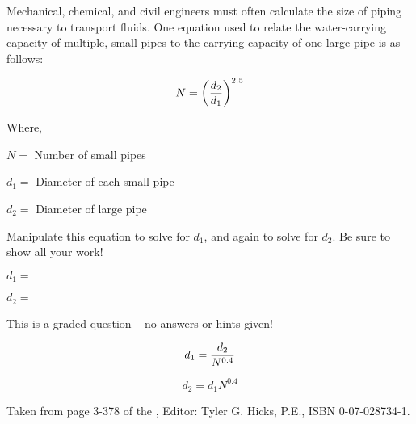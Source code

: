 

Mechanical, chemical, and civil engineers must often calculate the size of piping necessary to transport fluids.  One equation used to relate the water-carrying capacity of multiple, small pipes to the carrying capacity of one large pipe is as follows:

$$N = \biggl({d_2 \over d_1}\biggr)^{2.5}$$

\noindent
Where,

$N =$ Number of small pipes

$d_1 =$ Diameter of each small pipe

$d_2 =$ Diameter of large pipe

\vskip 30pt

Manipulate this equation to solve for $d_1$, and again to solve for $d_2$.  Be sure to show all your work!

\vskip 50pt

$d_1 = $

\vskip 100pt

$d_2 = $


\vfil 

\eject






This is a graded question -- no answers or hints given!







$$d_1 = {d_2 \over N^{0.4}}$$

$$d_2 = d_1 N^{0.4}$$

\vskip 10pt

Taken from page 3-378 of the , Editor: Tyler G. Hicks, P.E., ISBN 0-07-028734-1.




